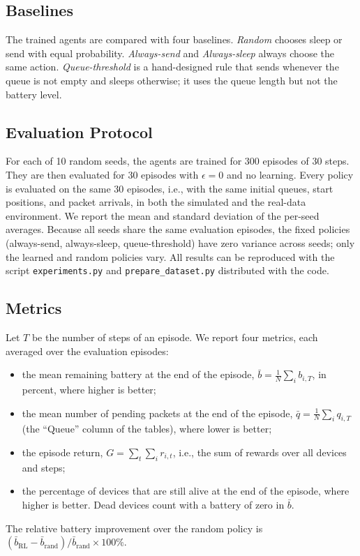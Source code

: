 \documentclass[conference]{IEEEtran}
\begin{document}
\subsection{Baselines}
The trained agents are compared with four baselines. \emph{Random} chooses sleep or send with equal probability. \emph{Always-send} and \emph{Always-sleep} always choose the same action. \emph{Queue-threshold} is a hand-designed rule that sends whenever the queue is not empty and sleeps otherwise; it uses the queue length but not the battery level.

\subsection{Evaluation Protocol}
For each of 10 random seeds, the agents are trained for 300 episodes of 30 steps. They are then evaluated for 30 episodes with $\epsilon=0$ and no learning. Every policy is evaluated on the same 30 episodes, i.e., with the same initial queues, start positions, and packet arrivals, in both the simulated and the real-data environment. We report the mean and standard deviation of the per-seed averages. Because all seeds share the same evaluation episodes, the fixed policies (always-send, always-sleep, queue-threshold) have zero variance across seeds; only the learned and random policies vary. All results can be reproduced with the script \texttt{experiments.py} and \texttt{prepare\_dataset.py} distributed with the code.

\subsection{Metrics}
Let $T$ be the number of steps of an episode. We report four metrics, each averaged over the evaluation episodes:
\begin{itemize}
    \item the mean remaining battery at the end of the episode, $\bar{b}=\frac{1}{N}\sum_{i} b_{i,T}$, in percent, where higher is better;
    \item the mean number of pending packets at the end of the episode, $\bar{q}=\frac{1}{N}\sum_{i} q_{i,T}$ (the ``Queue'' column of the tables), where lower is better;
    \item the episode return, $G=\sum_{t}\sum_{i} r_{i,t}$, i.e., the sum of rewards over all devices and steps;
    \item the percentage of devices that are still alive at the end of the episode, where higher is better. Dead devices count with a battery of zero in $\bar{b}$.
\end{itemize}
The relative battery improvement over the random policy is $(\bar{b}_{\text{RL}}-\bar{b}_{\text{rand}})/\bar{b}_{\text{rand}}\times 100\%$.
\end{document}
